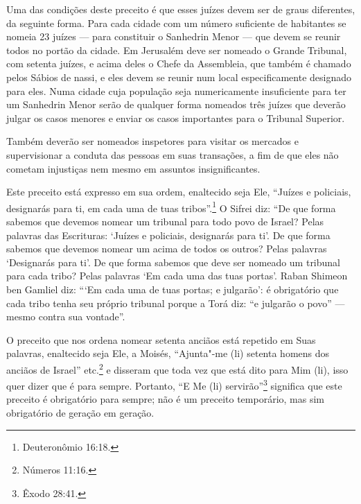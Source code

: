 \begin{multicols}{2}
Uma das condições deste preceito é que esses juízes devem ser de graus
diferentes, da seguinte forma. Para cada cidade com um número
suficiente de habitantes se nomeia 23 juízes --- para constituir o
Sanhedrin\starr{} Menor --- que devem se reunir todos no portão da cidade. Em
Jerusalém deve ser nomeado o Grande Tribunal, com setenta juízes, e
acima deles o Chefe da Assembleia, que também é chamado pelos Sábios de
nassi\starr, e eles devem se reunir num local especificamente designado
para eles. Numa cidade cuja população seja numericamente insuficiente
para ter um Sanhedrin\starr{} Menor serão de qualquer forma nomeados três
juízes que deverão julgar os casos menores e enviar os casos importantes
para o Tribunal Superior.

Também deverão ser nomeados inspetores para visitar os mercados e
supervisionar a conduta das pessoas em suas transações, a fim de que
eles não cometam injustiças nem mesmo em assuntos insignificantes.

Este preceito está expresso em sua ordem, enaltecido seja Ele, ``Juízes
e policiais, designarás para ti, em cada uma de tuas tribos''.\footnote{Deuteronômio 16:18.} O Sifrei\starr{} diz: ``De que forma sabemos que devemos
nomear um tribunal para todo povo de Israel? Pelas palavras das
Escrituras: `Juízes e policiais, designarás para ti'. De que forma
sabemos que devemos nomear um acima de todos os outros? Pelas palavras `Designarás para ti'. De que forma sabemos
que deve ser nomeado um tribunal para cada tribo? Pelas palavras `Em
cada uma das tuas portas'. Raban Shimeon ben Gamliel\starr{} diz: ```Em cada uma
de tuas portas; e julgarão': é obrigatório que cada tribo tenha seu
próprio tribunal porque a Torá\starr{} diz: ``e julgarão o povo'' --- mesmo
contra sua vontade''.

O preceito que nos ordena nomear setenta anciãos está repetido em Suas
palavras, enaltecido seja Ele, a Moisés, ``Ajunta"-me (li) setenta homens
dos anciãos de Israel'' etc.\footnote{Números 11:16.} e disseram que toda vez
que está dito para Mim (li), isso quer dizer que é para sempre.
Portanto, ``E Me (li) servirão''\footnote{Êxodo 28:41.} significa que este
preceito é obrigatório para sempre; não é um preceito temporário, mas
sim obrigatório de geração em geração.


\end{multicols}
